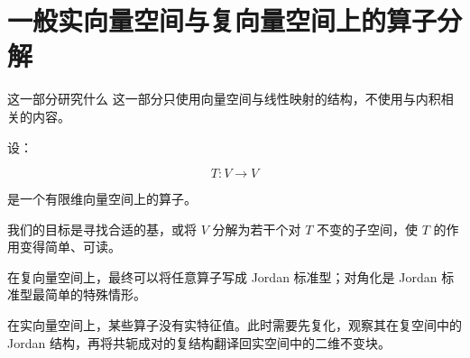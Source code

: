 
\part{一般实向量空间与复向量空间上的算子分解}

\thispagestyle{plain}
\begin{partintro}{这一部分研究什么}
这一部分只使用向量空间与线性映射的结构，不使用与内积相关的内容。

设：

\[
T:V\to V
\]

是一个有限维向量空间上的算子。

我们的目标是寻找合适的基，或将 $V$ 分解为若干个对 $T$ 不变的子空间，使 $T$ 的作用变得简单、可读。

在复向量空间上，最终可以将任意算子写成 Jordan 标准型；对角化是 Jordan 标准型最简单的特殊情形。

在实向量空间上，某些算子没有实特征值。此时需要先复化，观察其在复空间中的 Jordan 结构，再将共轭成对的复结构翻译回实空间中的二维不变块。
\end{partintro}

